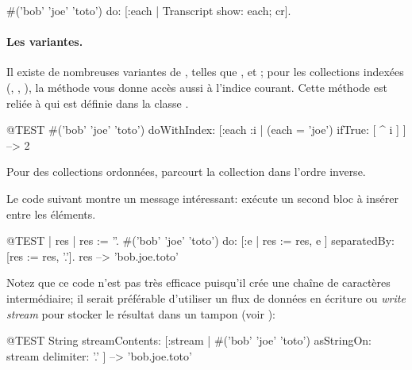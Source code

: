 \documentclass[a4paper,10pt,twoside]{book}
\begin{document}
\begin{code}{}
#('bob' 'joe' 'toto') do: [:each | Transcript show: each; cr].
\end{code}

\paragraph{Les variantes.} Il existe de nombreuses variantes de , 
telles que \mbox{,} 
\mbox{} 
et ;
pour les collections indexées (\mbox{,} 
\mbox{,} \mbox{),}
la méthode  
vous donne accès aussi à l'indice courant.
Cette méthode est reliée à  qui est définie dans la classe
.

\begin{code}{@TEST}
#('bob' 'joe' 'toto') doWithIndex: [:each :i | (each = 'joe') ifTrue: [ ^ i ] ] --> 2
\end{code}

Pour des collections ordonnées,  parcourt la collection dans l'ordre inverse.

Le code suivant montre un message intéressant:
 exécute un second bloc 
à insérer entre les éléments.
\begin{code}{@TEST | res | }
res := ''.
#('bob' 'joe' 'toto') do: [:e | res := res, e ] separatedBy: [res := res, '.'].
res --> 'bob.joe.toto'
\end{code}
\noindent
Notez que ce code n'est pas très efficace puisqu'il crée une chaîne
de caractères intermédiaire; il serait préférable d'utiliser
un flux de données en écriture ou \emph{write stream} pour stocker
le résultat dans un tampon (voir ):
\begin{code}{@TEST}
String streamContents: [:stream | #('bob' 'joe' 'toto') asStringOn: stream delimiter: '.' ] --> 'bob.joe.toto'
\end{code}

\end{document}
